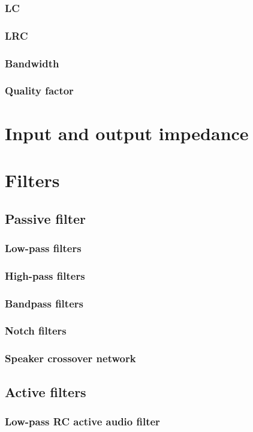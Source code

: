 \documentclass{report}
\begin{document}
\subsubsection{LC}
\subsubsection{LRC}
\subsubsection{Bandwidth}
\subsubsection{Quality factor}
\section{Input and output impedance}
\section{Filters}
\subsection{Passive filter}
\subsubsection{Low-pass filters}
\subsubsection{High-pass filters}
\subsubsection{Bandpass filters}
\subsubsection{Notch filters}
\subsubsection{Speaker crossover network}
\subsection{Active filters}
\subsubsection{Low-pass RC active audio filter}
\end{document}
